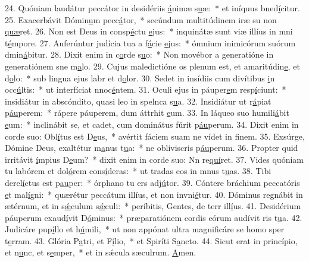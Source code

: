 24. Quóniam laudátur peccátor in desidériis \uline{á}nimæ s\uline{u}æ:~* et iníquus bned\uline{í}citur.
25. Exacerbávit Dómin\uline{u}m pecc\uline{á}tor,~* secúndum multitúdinem iræ su non \uline{quæ}ret.
26. Non est Deus in consp\uline{é}ctu \uline{e}jus:~* inquinátæ sunt viæ illíus in mni t\uline{é}mpore.
27. Auferúntur judícia tua a f\uline{á}cie \uline{e}jus:~* ómnium inimicórum suórum dmin\uline{á}bitur.
28. Dixit enim in c\uline{o}rde s\uline{u}o:~* Non movébor a generatióne in generatiónem sne m\uline{a}lo.
29. Cujus maledictióne os plenum est, et amaritúdin\uline{e}, et d\uline{o}lo:~* sub lingua ejus labr et d\uline{o}lor.
30. Sedet in insídiis cum divítibus \uline{i}n occ\uline{ú}ltis:~* ut interfíciat nnoc\uline{é}ntem.
31. Oculi ejus in páuper\uline{e}m resp\uline{í}ciunt:~* insidiátur in abscóndito, quasi leo in spelnca s\uline{u}a.
32. Insidiátur ut r\uline{á}piat p\uline{áu}perem:~* rápere páuperem, dum áttrhit \uline{e}um.
33. In láqueo suo humili\uline{á}bit \uline{e}um:~* inclinábit se, et cadet, cum dominátus fúrit p\uline{áu}perum.
34. Dixit enim in corde suo: Obl\uline{í}tus est D\uline{e}us,~* avértit fáciem suam ne vídet in f\uline{i}nem.
35. Exsúrge, Dómine Deus, exaltétur m\uline{a}nus t\uline{u}a:~* ne obliviscris p\uline{áu}perum.
36. Propter quid irritávit \uline{í}mpius D\uline{e}um?~* dixit enim in corde suo: Nn re\uline{quí}ret.
37. Vides quóniam tu labórem et dol\uline{ó}rem cons\uline{í}deras:~* ut tradas eos in mnus t\uline{u}as.
38. Tibi derel\uline{í}ctus est p\uline{au}per:~* órphano tu ers adj\uline{ú}tor.
39. Cóntere bráchium peccatóris \uline{e}t mal\uline{í}gni:~* quærétur peccátum illíus, et non invni\uline{é}tur.
40. Dóminus regnábit in ætérnum, et in s\uline{ǽ}culum s\uline{ǽ}culi:~* períbitis, Gentes, de terr ill\uline{í}us.
41. Desidérium páuperum exaud\uline{í}vit D\uline{ó}minus:~* præparatiónem cordis eórum audívit ris t\uline{u}a.
42. Judicáre pup\uline{í}llo et h\uline{ú}mili,~* ut non appónat ultra magnificáre se homo sper t\uline{e}rram.
43. Glória P\uline{a}tri, et F\uline{í}lio,~* et Spiríti S\uline{a}ncto.
44. Sicut erat in princípio, et n\uline{u}nc, et s\uline{e}mper,~* et in sǽcula sæculrum. \uline{A}men.
